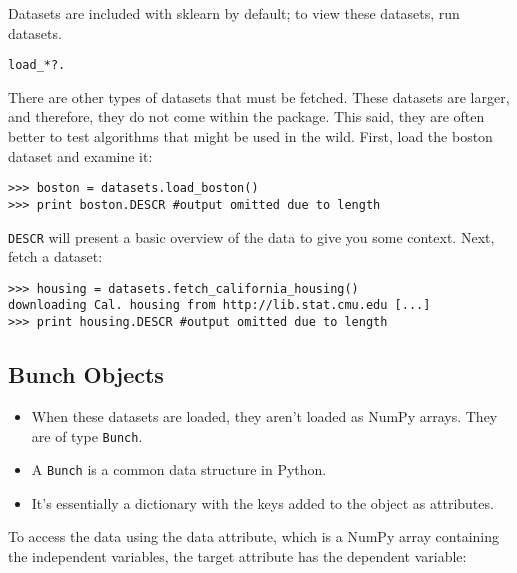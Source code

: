\documentclass[SKL-MASTER.tex]{subfiles}
\begin{document}
Datasets are included with sklearn by default; to view these datasets, run datasets.
\begin{framed}
\begin{verbatim}
load_*?. 
\end{verbatim}
\end{framed}
There are other types of datasets that must be fetched. These datasets are
larger, and therefore, they do not come within the package. This said, they are often
better to test algorithms that might be used in the wild.
First, load the boston dataset and examine it:
\begin{framed}
\begin{verbatim}
>>> boston = datasets.load_boston()
>>> print boston.DESCR #output omitted due to length
\end{verbatim}
\end{framed}
\texttt{DESCR} will present a basic overview of the data to give you some context.
Next, fetch a dataset:
\begin{framed}
	\begin{verbatim}
>>> housing = datasets.fetch_california_housing()
downloading Cal. housing from http://lib.stat.cmu.edu [...]
>>> print housing.DESCR #output omitted due to length
\end{verbatim}
\end{framed}
\subsection*{Bunch Objects} %
\begin{itemize}
\item When these datasets are loaded, they aren't loaded as NumPy arrays. They are of type \texttt{Bunch}.
\item A \texttt{Bunch} is a common data structure in Python. \item It's essentially a dictionary with the keys
added to the object as attributes.
\end{itemize}

To access the data using the data attribute, which is a NumPy array containing the
independent variables, the target attribute has the dependent variable:
\end{document}

